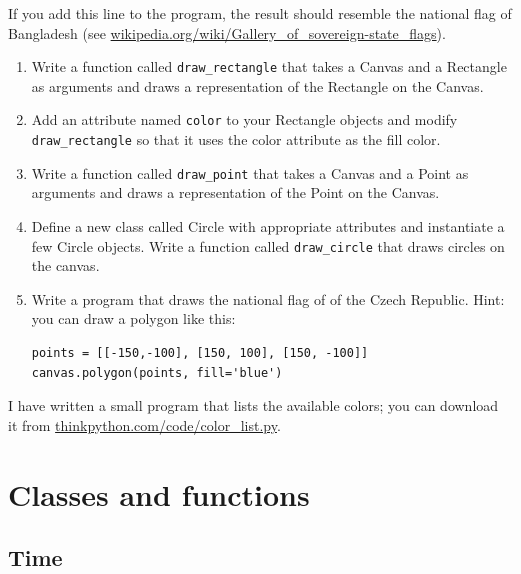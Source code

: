\documentclass[10pt]{book}
\begin{document}
\begin{ex}
If you add this line to the program, 
the result should resemble the national flag of Bangladesh
(see \url{wikipedia.org/wiki/Gallery_of_sovereign-state_flags}).

\begin{enumerate}

\item Write a function called \verb"draw_rectangle" that takes a
  Canvas and a Rectangle as arguments and draws a
  representation of the Rectangle on the Canvas.

\item Add an attribute named {\tt color} to your Rectangle objects and
  modify \verb"draw_rectangle" so that it uses the color attribute as
  the fill color.

\item Write a function called \verb"draw_point" that takes a
  Canvas and a Point as arguments and draws a
  representation of the Point on the Canvas.

\item Define a new class called Circle with appropriate attributes and
  instantiate a few Circle objects.  Write a function called
  \verb"draw_circle" that draws circles on the canvas.


\item Write a program that draws the national flag of of the Czech Republic.
Hint: you can draw a polygon like this:

\beforeverb
\begin{verbatim}
points = [[-150,-100], [150, 100], [150, -100]]
canvas.polygon(points, fill='blue')
\end{verbatim}
\afterverb

\end{enumerate}


I have written a small program that lists the available colors;
you can download it from \url{thinkpython.com/code/color_list.py}.

\end{ex}



\chapter{Classes and functions}
\label{time}


\section{Time}
\end{document}
